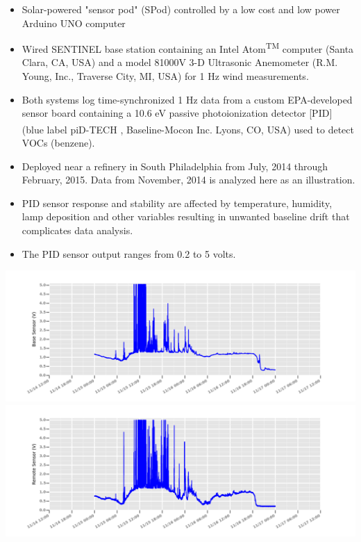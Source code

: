 \documentclass[a0, landscape]{a0poster}
\begin{document}
\begin{multicols}{3}
\begin{minipage}{.14\textwidth}
\begin{center}
	\end{center}
\end{minipage}
\vspace{40pt}
\begin{itemize}
		\item Solar-powered "sensor pod" (SPod) controlled by a low cost and low power Arduino UNO computer
		\item Wired SENTINEL base station containing an Intel Atom\textsuperscript{TM} computer (Santa Clara, CA, USA) and a model 81000V 3-D Ultrasonic Anemometer (R.M. Young, Inc., Traverse City, MI, USA) for 1 Hz wind measurements.
		\item Both systems log time-synchronized 1 Hz data from a custom EPA-developed sensor board containing a 10.6 eV passive photoionization detector [PID] (blue label piD-TECH \textsuperscript{\textregistered}, Baseline-Mocon Inc. Lyons, CO, USA) used to detect VOCs (benzene). 
		\item Deployed near a refinery in South Philadelphia from July, 2014 through February, 2015. Data from November, 2014 is analyzed here as an illustration.
		\item PID sensor response and stability are affected by temperature, humidity, lamp deposition and other variables resulting in unwanted baseline drift that complicates data analysis.	
		\item The PID sensor output ranges from 0.2 to 5 volts. 	
\end{itemize} 
\vspace{20pt}
\begin{center}
	\includegraphics[width=\linewidth]{Base}
	\includegraphics[width=\linewidth]{Remote}
\end{center}


\end{multicols}
\end{document}
